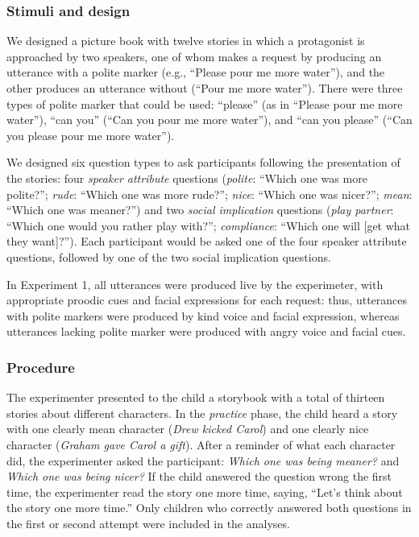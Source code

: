 \documentclass[10pt, letterpaper]{article}
\begin{document}
\subsubsection{Stimuli and design}\label{stimuli-and-design}

We designed a picture book with twelve stories in which a protagonist is
approached by two speakers, one of whom makes a request by producing an
utterance with a polite marker (e.g., ``Please pour me more water''),
and the other produces an utterance without (``Pour me more water'').
There were three types of polite marker that could be used: ``please''
(as in ``Please pour me more water''), ``can you'' (``Can you pour me
more water''), and ``can you please'' (``Can you please pour me more
water'').

We designed six question types to ask participants following the
presentation of the stories: four \emph{speaker attribute} questions
(\emph{polite}: ``Which one was more polite?''; \emph{rude}: ``Which one
was more rude?''; \emph{nice}: ``Which one was nicer?''; \emph{mean}:
``Which one was meaner?'') and two \emph{social implication} questions
(\emph{play partner}: ``Which one would you rather play with?'';
\emph{compliance}: ``Which one will {[}get what they want{]}?''). Each
participant would be asked one of the four speaker attribute questions,
followed by one of the two social implication questions.

In Experiment 1, all utterances were produced live by the experimeter,
with appropriate proodic cues and facial expressions for each request:
thus, utterances with polite markers were produced by kind voice and
facial expression, whereas utterances lacking polite marker were
produced with angry voice and facial cues.

\subsubsection{Procedure}\label{procedure}

The experimenter presented to the child a storybook with a total of
thirteen stories about different characters. In the \emph{practice}
phase, the child heard a story with one clearly mean character
(\emph{Drew kicked Carol}) and one clearly nice character (\emph{Graham
gave Carol a gift}). After a reminder of what each character did, the
experimenter asked the participant: \emph{Which one was being meaner?}
and \emph{Which one was being nicer?} If the child answered the question
wrong the first time, the experimenter read the story one more time,
saying, ``Let's think about the story one more time.'' Only children who
correctly answered both questions in the first or second attempt were
included in the analyses.
\end{document}
